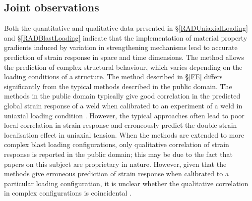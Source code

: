 \subsection{Joint observations}
Both the quantitative and qualitative data presented in \S\ref{RADUniaxialLoading} and \S\ref{RADBlastLoading} indicate that the implementation of material property gradients induced by variation in strengthening mechanisms lead to accurate prediction of strain response in space and time dimensions. The method allows the prediction of complex structural behaviour, which varies depending on the loading conditions of a structure. 
The method described in \S\ref{FE} differs significantly from the typical methods described in the public domain. The methods in the public domain typically give good correlation in the predicted global strain response of a weld when calibrated to an experiment of a weld in uniaxial loading condition \cite{McWilliams2013,Grujicic2011}. However, the typical approaches often lead to poor local correlation in strain response and erroneously predict the double strain localisation effect in uniaxial tension. When the methods are extended to more complex blast loading configurations, only qualitative correlation of strain response is reported in the public domain; this may be due to the fact that papers on this subject are proprietary in nature. However, given that the methods give erroneous prediction of strain response when calibrated to a particular loading configuration, it is unclear whether the qualitative correlation in complex configurations is coincidental \cite{McWilliams2013,Grujicic2011}. 
